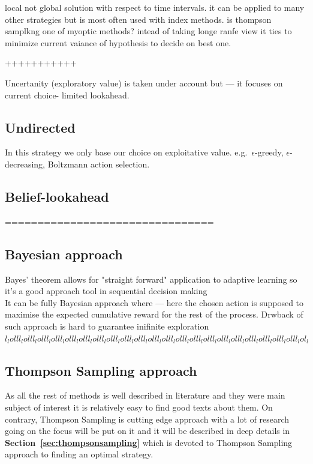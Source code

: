 \documentclass[12pt, a4paper, pdflatex, leqno]{report}
\begin{document}
local not global solution with respect to time intervals.
it can be applied to many other strategies but is most often used with index methods.
is thompson samplkng one of myoptic methods? intead of taking longe ranfe view it ties to minimize current vaiance of hypothesis to decide on best one.

+++++++++++

Uncertanity (exploratory value) is taken under account but --- it focuses on current choice- limited lookahead.

\subsection{Undirected}
In this strategy we only base our choice on exploitative value. e.g.\ $\epsilon$-greedy, $\epsilon$-decreasing, Boltzmann action selection.

\subsection{Belief-lookahead}
================================
\subsection{Bayesian approach}
Bayes' theorem allows for "straight forward" application to adaptive learning so it's a good approach tool in sequential decision making \\

It can be fully Bayesian approach where --- here the chosen action is supposed to maximise the expected cumulative reward for the rest of the process. Drwback of such approach is hard to guarantee inifinite exploration
$l_lo lll_lo lll_lo lll_lo lll_lo lll_lo lll_lo lll_lo lll_lo lll_lo lll_lo lll_lo lll_lo lll_lo lll_lo lll_lo lll_lo lll_lo lll_lo lll_lo lll_lo lll_lo l_l$

\subsection{Thompson Sampling approach}
As all the rest of methods is well described in literature and they were main subject of interest it is relatively easy to find good texts about them. On contrary, Thompson Sampling is cutting edge approach with a lot of research going on the focus will be put on it and it will be described in deep details in  \textbf{Section~\ref{sec:thompsonsampling}} which is devoted to Thompson Sampling approach to finding an optimal strategy.
\end{document}
